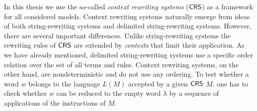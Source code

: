In this thesis we use the so-called \emph{context rewriting systems} ($\textup{\sf CRS\/}$) as a framework for all considered models. Context rewriting systems naturally emerge from ideas of both string-rewriting systems and delimited string-rewriting systems. However, there are several important differences. Unlike string-rewriting systems the rewriting rules of $\textup{\sf CRS\/}$ are extended by \emph{contexts} that limit their application. As we have already mentioned, delimited string-rewriting systems use a specific order relation over the set of all terms and rules. Context rewriting systems, on the other hand, are nondeterministic and do not use any ordering. To test whether a word $w$ belongs to the language $L(M)$ accepted by a given $\textup{\sf CRS\/}$ $M$, one has to check whether $w$ can be reduced to the empty word $\lambda$ by a sequence of applications of the instructions of $M$.

